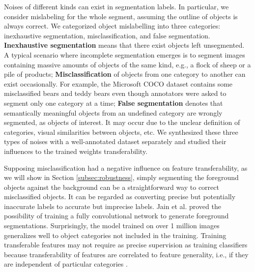 
Noises of different kinds can exist in segmentation labels. %
In particular, we consider mislabeling for the whole segment, assuming the outline of objects is always correct.
We categorized object mislabelling into three categories: inexhaustive segmentation, misclassification, and false segmentation.
\textbf{Inexhaustive segmentation} means that there exist objects left unsegmented.
A typical scenario where incomplete segmentation emerges is to segment images containing massive amounts of objects of the same kind, e.g., a flock of sheep or a pile of products;
\textbf{Misclassification} of objects from one category to another can exist occasionally.
For example, the Microsoft COCO dataset \cite{lin2014microsoft} contains some misclassified bears and teddy bears even though annotators were asked to segment only one category at a time;
\textbf{False segmentation} denotes that semantically meaningful objects from an undefined category are wrongly segmented, as objects of interest.
It may occur due to the unclear definition of categories, visual similarities between objects, etc.
We synthesized these three types of noises with a well-annotated dataset separately and studied their influences to the trained weights transferability.




Supposing misclassification had a negative influence on feature transferability, as we will show in Section \ref{subsec:robustness}, simply segmenting the foreground objects against the background can be a straightforward way to correct misclassified objects.
It can be regarded as converting precise but potentially inaccurate labels to accurate but imprecise labels.
Jain et al. \cite{jain2017pixel} proved the possibility of training a fully convolutional network to generate foreground segmentations.
Surprisingly, the model trained on over 1 million images generalizes well to object categories not included in the training.
Training transferable features may not require as precise supervision as training classifiers because transferability of features are correlated to feature generality, i.e., if they are independent of particular categories \cite{yosinski2014transferable}.


